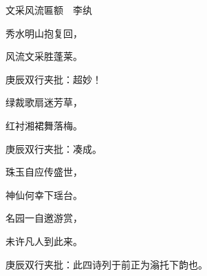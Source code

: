 \begin{poem}
    \begin{pl}文采风流匾额　李纨\end{pl}

    \begin{pl}秀水明山抱复回，\end{pl}

    \begin{pl}风流文采胜蓬莱。    \end{pl}
    \begin{note}庚辰双行夹批：超妙！\end{note}

    \begin{pl}绿裁歌扇迷芳草，\end{pl}

    \begin{pl}红衬湘裙舞落梅。    \end{pl}
    \begin{note}庚辰双行夹批：凑成。\end{note}

    \begin{pl}珠玉自应传盛世，\end{pl}

    \begin{pl}神仙何幸下瑶台。\end{pl}

    \begin{pl}名园一自邀游赏，\end{pl}

    \begin{pl}未许凡人到此来。    \end{pl}
    \begin{note}庚辰双行夹批：此四诗列于前正为滃托下韵也。\end{note}

\end{poem}

